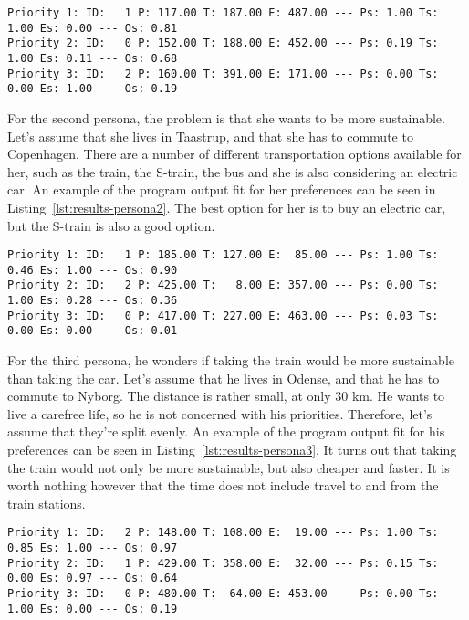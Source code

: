 \begin{lstlisting}[label={lst:results-persona1}, caption={Output for Asger Johansen.}, captionpos=b, language={}]
Priority 1: ID:   1 P: 117.00 T: 187.00 E: 487.00 --- Ps: 1.00 Ts: 1.00 Es: 0.00 --- Os: 0.81
Priority 2: ID:   0 P: 152.00 T: 188.00 E: 452.00 --- Ps: 0.19 Ts: 1.00 Es: 0.11 --- Os: 0.68
Priority 3: ID:   2 P: 160.00 T: 391.00 E: 171.00 --- Ps: 0.00 Ts: 0.00 Es: 1.00 --- Os: 0.19
\end{lstlisting}

For the second persona, the problem is that she wants to be more sustainable.
Let's assume that she lives in Taastrup, and that she has to commute to Copenhagen.
There are a number of different transportation options available for her, such as the train, the S-train, the bus and
she is also considering an electric car.
An example of the program output fit for her preferences can be seen in Listing~\ref{lst:results-persona2}.
The best option for her is to buy an electric car, but the S-train is also a good option.

\begin{lstlisting}[label={lst:results-persona2}, caption={Output for Josefine Madsen.}, captionpos=b, language={}]
Priority 1: ID:   1 P: 185.00 T: 127.00 E:  85.00 --- Ps: 1.00 Ts: 0.46 Es: 1.00 --- Os: 0.90
Priority 2: ID:   2 P: 425.00 T:   8.00 E: 357.00 --- Ps: 0.00 Ts: 1.00 Es: 0.28 --- Os: 0.36
Priority 3: ID:   0 P: 417.00 T: 227.00 E: 463.00 --- Ps: 0.03 Ts: 0.00 Es: 0.00 --- Os: 0.01
\end{lstlisting}

For the third persona, he wonders if taking the train would be more sustainable than taking the car.
Let's assume that he lives in Odense, and that he has to commute to Nyborg.
The distance is rather small, at only 30 km.
He wants to live a carefree life, so he is not concerned with his priorities.
Therefore, let's assume that they're split evenly.
An example of the program output fit for his preferences can be seen in Listing~\ref{lst:results-persona3}.
It turns out that taking the train would not only be more sustainable, but also cheaper and faster.
It is worth nothing however that the time does not include travel to and from the train stations.

\begin{lstlisting}[label={lst:results-persona3}, caption={Output for Martin Jensen.}, captionpos=b, language={}]
Priority 1: ID:   2 P: 148.00 T: 108.00 E:  19.00 --- Ps: 1.00 Ts: 0.85 Es: 1.00 --- Os: 0.97
Priority 2: ID:   1 P: 429.00 T: 358.00 E:  32.00 --- Ps: 0.15 Ts: 0.00 Es: 0.97 --- Os: 0.64
Priority 3: ID:   0 P: 480.00 T:  64.00 E: 453.00 --- Ps: 0.00 Ts: 1.00 Es: 0.00 --- Os: 0.19
\end{lstlisting}

